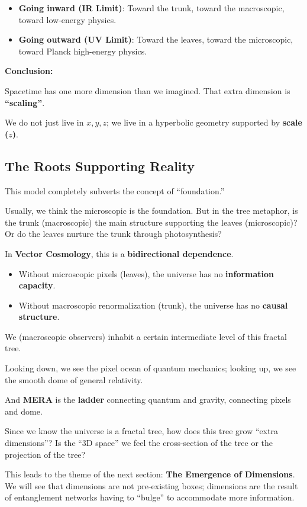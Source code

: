 \begin{itemize}
\item \textbf{Going inward (IR Limit)}: Toward the trunk, toward the macroscopic, toward low-energy physics.

\item \textbf{Going outward (UV Limit)}: Toward the leaves, toward the microscopic, toward Planck high-energy physics.
\end{itemize}

\textbf{Conclusion:}

Spacetime has one more dimension than we imagined. That extra dimension is \textbf{``scaling''}.

We do not just live in $x, y, z$; we live in a hyperbolic geometry supported by \textbf{scale ($z$)}.

\subsection{The Roots Supporting Reality}

This model completely subverts the concept of ``foundation.''

Usually, we think the microscopic is the foundation. But in the tree metaphor, is the trunk (macroscopic) the main structure supporting the leaves (microscopic)? Or do the leaves nurture the trunk through photosynthesis?

In \textbf{Vector Cosmology}, this is a \textbf{bidirectional dependence}.

\begin{itemize}
\item Without microscopic pixels (leaves), the universe has no \textbf{information capacity}.

\item Without macroscopic renormalization (trunk), the universe has no \textbf{causal structure}.
\end{itemize}

We (macroscopic observers) inhabit a certain intermediate level of this fractal tree.

Looking down, we see the pixel ocean of quantum mechanics; looking up, we see the smooth dome of general relativity.

And \textbf{MERA} is the \textbf{ladder} connecting quantum and gravity, connecting pixels and dome.

Since we know the universe is a fractal tree, how does this tree grow ``extra dimensions''? Is the ``3D space'' we feel the cross-section of the tree or the projection of the tree?

This leads to the theme of the next section: \textbf{The Emergence of Dimensions}. We will see that dimensions are not pre-existing boxes; dimensions are the result of entanglement networks having to ``bulge'' to accommodate more information.

